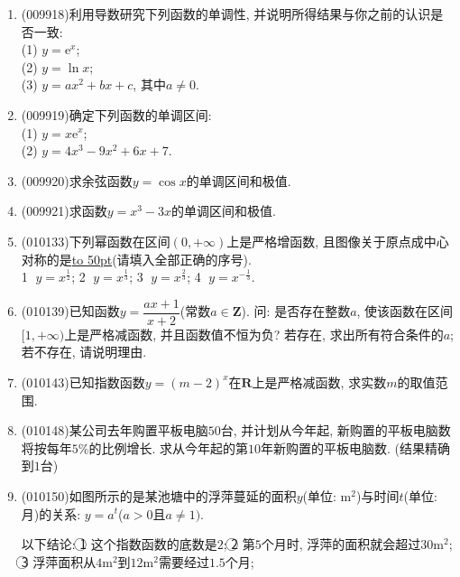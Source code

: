 \documentclass[10pt,a4paper]{article}
\newcommand{\blank}[1]{\underline{\hbox to #1pt{}}}
\begin{document}
\begin{enumerate}[1.]
\item {\tiny (009918)}利用导数研究下列函数的单调性, 并说明所得结果与你之前的认识是否一致:\\
(1) $y=\mathrm{e}^x$;\\
(2) $y=\ln x$;\\
(3) $y=ax^2+bx+c$, 其中$a\ne 0$.
\item {\tiny (009919)}确定下列函数的单调区间:\\
(1) $y=x\mathrm{e}^x$;\\
(2) $y=4x^3-9x^2+6x+7$.
\item {\tiny (009920)}求余弦函数$y=\cos x$的单调区间和极值.
\item {\tiny (009921)}求函数$y=x^3-3x$的单调区间和极值.
\item {\tiny (010133)}下列幂函数在区间$(0, +\infty)$上是严格增函数, 且图像关于原点成中心对称的是\blank{50}(请填入全部正确的序号).\\
\textcircled{1} $y=x^\frac 12$; \textcircled{2} $y=x^\frac 13$; \textcircled{3} $y=x^\frac 23$; \textcircled{4} $y=x^{-\frac 13}$.
\item {\tiny (010139)}已知函数$y=\dfrac{ax+1}{x+2}$(常数$a\in \mathbf{Z}$). 问: 是否存在整数$a$, 使该函数在区间$[1, +\infty)$上是严格减函数, 并且函数值不恒为负?  若存在, 求出所有符合条件的$a$; 若不存在, 请说明理由.
\item {\tiny (010143)}已知指数函数$y=(m-2)^x$在$\mathbf{R}$上是严格减函数, 求实数$m$的取值范围.
\item {\tiny (010148)}某公司去年购置平板电脑$50$台, 并计划从今年起, 新购置的平板电脑数将按每年$5\%$的比例增长. 求从今年起的第$10$年新购置的平板电脑数. (结果精确到$1$台)
\item {\tiny (010150)}如图所示的是某池塘中的浮萍蔓延的面积$y$(单位: $\text{m}^2$)与时间$t$(单位: 月)的关系: $y=a^t$($a>0$且$a\ne 1)$. 
\begin{center}
\end{center}
以下结论:
\textcircled{1} 这个指数函数的底数是$2$; 
\textcircled{2} 第$5$个月时, 浮萍的面积就会超过$30\text{m}^2$;
\textcircled{3} 浮萍面积从$4\text{m}^2$到$12\text{m}^2$需要经过$1.5$个月;

\end{enumerate}
\end{document}
